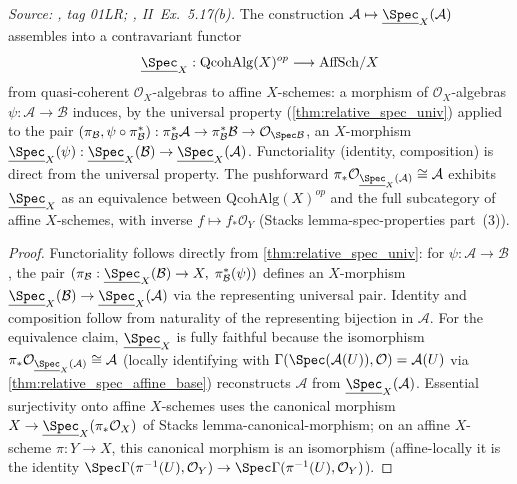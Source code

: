 \begin{theorem}
  \label{thm:relative_spec_functorial}
  \textit{Source: \cite{stacks-project}, tag 01LR; \cite{hartshorne-ag}, II~Ex.~5.17(b).}
  The construction \(\mathcal{A} \mapsto \underline{\Spec}_X(\mathcal{A})\) assembles into
  a contravariant functor
  \[
    \underline{\Spec}_X : \mathrm{QcohAlg}(X)^{op} \longrightarrow \mathrm{AffSch}/X
  \]
  from quasi-coherent \(\mathcal{O}_X\)-algebras to affine \(X\)-schemes: a morphism of
  \(\mathcal{O}_X\)-algebras \(\psi : \mathcal{A} \to \mathcal{B}\) induces, by the universal
  property (\cref{thm:relative_spec_univ}) applied to the pair
  $(\pi_{\mathcal{B}}, \psi \circ \pi_{\mathcal{B}}^*) :
  \pi_{\mathcal{B}}^*\mathcal{A} \to \pi_{\mathcal{B}}^*\mathcal{B} \to
  \mathcal{O}_{\Spec\mathcal{B}}$,
  an \(X\)-morphism
  \(\underline{\Spec}_X(\psi) : \underline{\Spec}_X(\mathcal{B}) \to \underline{\Spec}_X(\mathcal{A})\).
  Functoriality (identity, composition) is direct from the universal property. The
  pushforward \(\pi_* \mathcal{O}_{\underline{\Spec}_X(\mathcal{A})} \cong \mathcal{A}\)
  exhibits \(\underline{\Spec}_X\) as an equivalence between \(\mathrm{QcohAlg}(X)^{op}\) and
  the full subcategory of affine \(X\)-schemes, with inverse \(f \mapsto f_* \mathcal{O}_Y\)
  (Stacks lemma-spec-properties part~(3)).
\end{theorem}

\begin{proof}
  Functoriality follows directly from \cref{thm:relative_spec_univ}: for
  \(\psi : \mathcal{A} \to \mathcal{B}\), the pair
  \((\pi_{\mathcal{B}} : \underline{\Spec}_X(\mathcal{B}) \to X, \;
  \pi_{\mathcal{B}}^*(\psi))\) defines an \(X\)-morphism
  \(\underline{\Spec}_X(\mathcal{B}) \to \underline{\Spec}_X(\mathcal{A})\) via the
  representing universal pair. Identity and composition follow from naturality of the
  representing bijection in \(\mathcal{A}\). For the equivalence claim, \(\underline{\Spec}_X\)
  is fully faithful because the isomorphism
  \(\pi_* \mathcal{O}_{\underline{\Spec}_X(\mathcal{A})} \cong \mathcal{A}\)
  (locally identifying with \(\Gamma(\Spec(\mathcal{A}(U)),\mathcal{O}) = \mathcal{A}(U)\)
  via \cref{thm:relative_spec_affine_base}) reconstructs \(\mathcal{A}\) from
  \(\underline{\Spec}_X(\mathcal{A})\). Essential surjectivity onto affine \(X\)-schemes uses
  the canonical morphism \(X \to \underline{\Spec}_X(\pi_*\mathcal{O}_X)\) of Stacks
  lemma-canonical-morphism; on an affine \(X\)-scheme \(\pi : Y \to X\), this canonical
  morphism is an isomorphism (affine-locally it is the identity
  \(\Spec\Gamma(\pi^{-1}(U), \mathcal{O}_Y) \to \Spec\Gamma(\pi^{-1}(U), \mathcal{O}_Y)\)).
\end{proof}

